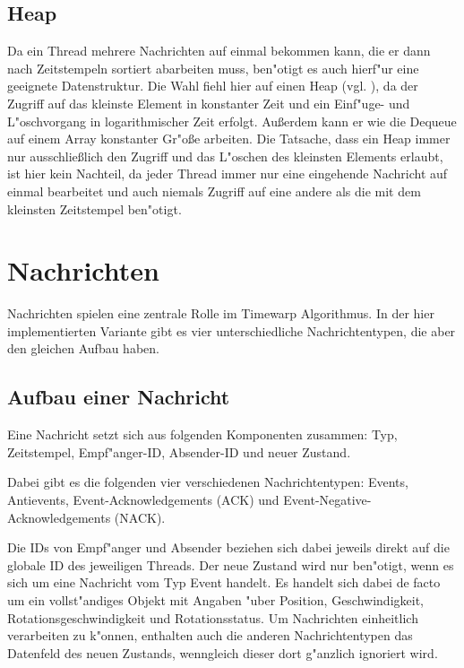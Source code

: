 \documentclass[a4paper, 10pt, openright, parskip, chapterprefix]{scrreprt}
\begin{document}
\subsection{Heap}
Da ein Thread mehrere Nachrichten auf einmal bekommen kann, die er dann nach Zeitstempeln sortiert abarbeiten muss,
ben"otigt es auch hierf"ur eine geeignete Datenstruktur. Die Wahl fiehl hier auf einen Heap (vgl. \cite{...}), da der
Zugriff auf das kleinste Element in konstanter Zeit und ein Einf"uge- und L"oschvorgang in logarithmischer Zeit erfolgt.
Au\ss erdem kann er wie die Dequeue auf einem Array konstanter Gr"o\ss e arbeiten.
Die Tatsache, dass ein Heap immer nur ausschlie\ss lich den Zugriff und das L"oschen des kleinsten Elements erlaubt, ist
hier kein Nachteil, da jeder Thread immer nur eine eingehende Nachricht auf einmal bearbeitet und auch niemals Zugriff auf eine
andere als die mit dem kleinsten Zeitstempel ben"otigt.

\section{Nachrichten}
Nachrichten spielen eine zentrale Rolle im Timewarp Algorithmus. In der hier implementierten Variante gibt es vier
unterschiedliche Nachrichtentypen, die aber den gleichen Aufbau haben.
\subsection{Aufbau einer Nachricht}
Eine Nachricht setzt sich aus folgenden Komponenten zusammen: Typ, Zeitstempel, Empf"anger-ID, Absender-ID und neuer
Zustand.

Dabei gibt es die folgenden vier verschiedenen Nachrichtentypen:
Events, Antievents, Event-Acknowledgements (ACK) und Event-Negative-Acknowledgements (NACK).

Die IDs von Empf"anger und Absender beziehen sich dabei jeweils direkt auf die globale ID des jeweiligen Threads. Der
neue Zustand wird nur ben"otigt, wenn es sich um eine Nachricht vom Typ Event handelt. Es handelt sich dabei de facto um
ein vollst"andiges Objekt mit Angaben "uber Position, Geschwindigkeit, Rotationsgeschwindigkeit und Rotationsstatus. Um
Nachrichten einheitlich verarbeiten zu k"onnen, enthalten auch die anderen Nachrichtentypen das Datenfeld des neuen
Zustands, wenngleich dieser dort g"anzlich ignoriert wird.
\end{document}
